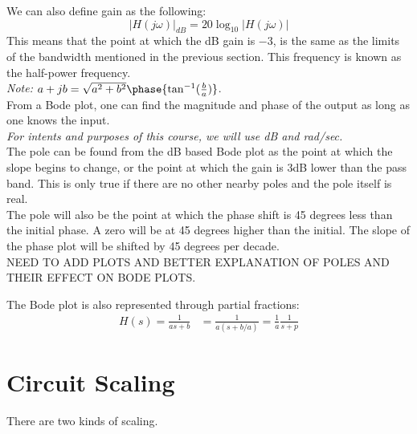 \documentclass[nobib]{tufte-handout}
\begin{document}
We can also define gain as the following:
\begin{equation*}
    |H(j\omega)|_{dB} = 20\log_{10}|H(j\omega)|
\end{equation*}
This means that the point at which the dB gain is $-3$, is the same as the limits of the bandwidth mentioned in the previous section. This frequency is known as the half-power frequency.\\
\textit{Note: $a+jb = \sqrt{a^2+b^2}\phase{\tan^{-1}(\frac{b}{a})}$}.\\
From a Bode plot, one can find the magnitude and phase of the output as long as one knows the input.\\
\textit{For intents and purposes of this course,  we will use dB and rad/sec.}\\
The pole can be found from the dB based Bode plot as the point at which the slope begins to change, or the point at which the gain is 3dB lower than the pass band. This is only true if there are no other nearby poles and the pole itself is real.\\
The pole will also be the point at which the phase shift is 45 degrees less than the initial phase. A zero will be at 45 degrees higher than the initial. The slope of the phase plot will be shifted by 45 degrees per decade.\\

NEED TO ADD PLOTS AND BETTER EXPLANATION OF POLES AND THEIR EFFECT ON BODE
PLOTS.

The Bode plot is also represented through partial fractions:
\begin{align*}
    H(s) = \frac{1}{as+b} & = \frac{1}{a(s+b/a)} = \frac{1}{a}\frac{1}{s+p}
\end{align*}

\section{Circuit Scaling}
There are two kinds of scaling.
\end{document}
